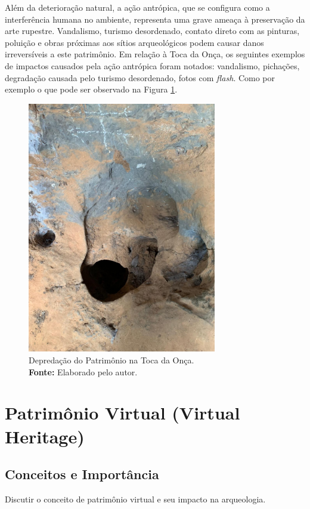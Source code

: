 Além da deterioração natural, a ação antrópica, que se configura como a interferência humana no ambiente, representa uma grave ameaça à preservação da arte rupestre. Vandalismo, turismo desordenado, contato direto com as pinturas, poluição e obras próximas aos sítios arqueológicos podem causar danos irreversíveis a este patrimônio.
Em relação à Toca da Onça, os seguintes exemplos de impactos causados pela ação antrópica foram notados: vandalismo, pichações, degradação causada pelo turismo desordenado, fotos com \textit{flash}. Como por exemplo o que pode ser observado na Figura \ref{fig:degradacao_toca_onca}.

\begin{figure}[H]
    \centering
    \includegraphics[height=11cm, keepaspectratio]{img/jogo da velha.jpeg}
    \caption{Depredação do Patrimônio na Toca da Onça. \\
        \textbf{Fonte:} Elaborado pelo autor.}
    \label{fig:degradacao_toca_onca}
\end{figure}


\section{Patrimônio Virtual (Virtual Heritage)}
\subsection{Conceitos e Importância}
Discutir o conceito de patrimônio virtual e seu impacto na arqueologia.

